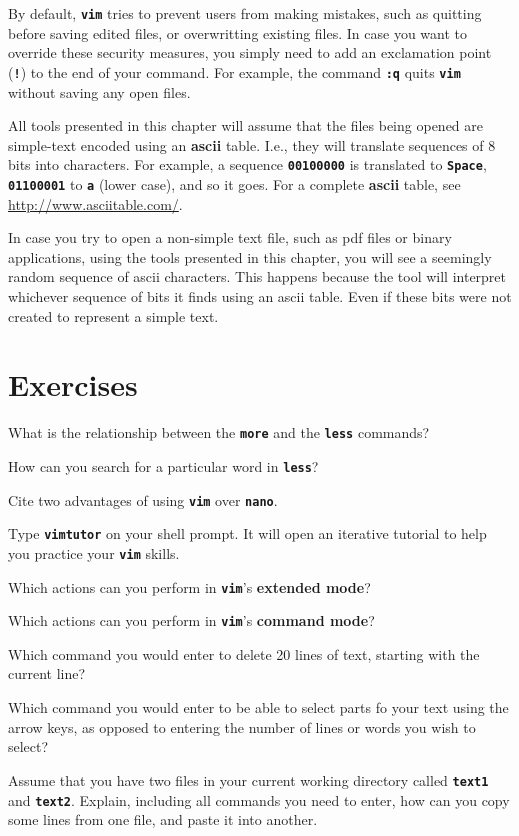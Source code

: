 By default, \textbf{\texttt{vim}} tries to prevent users from making mistakes, such as quitting before saving edited files, or overwritting existing files. In case you want to override these security measures, you simply need to add an exclamation point (\textbf{\texttt{!}}) to the end of your command. For example, the command \textbf{\texttt{:q}} quits \textbf{\texttt{vim}} without saving any open files.

\begin{my_box}
All tools presented in this chapter will assume that the files being opened are simple-text encoded using an \textbf{ascii} table. I.e., they will translate sequences of 8 bits into characters. For example, a sequence \textbf{\texttt{00100000}} is translated to \textbf{\texttt{Space}}, \textbf{\texttt{01100001}} to \textbf{\texttt{a}} (lower case), and so it goes. For a complete \textbf{ascii} table, see \url{http://www.asciitable.com/}.

In case you try to open a non-simple text file, such as pdf files or binary applications, using the tools presented in this chapter, you will see a seemingly random sequence of ascii characters. This happens because the tool will interpret whichever sequence of bits it finds using an ascii table. Even if these bits were not created to represent a simple text.
\end{my_box}


\section*{Exercises}

\begin{exercises}
  \item What is the relationship between the \textbf{\texttt{more}} and the \textbf{\texttt{less}} commands?
  \item How can you search for a particular word in \textbf{\texttt{less}}?
  \item Cite two advantages of using \textbf{\texttt{vim}} over \textbf{\texttt{nano}}.
  \item Type \textbf{\texttt{vimtutor}} on your shell prompt. It will open an iterative tutorial to help you practice your \textbf{\texttt{vim}} skills.
  \item Which actions can you perform in \textbf{\texttt{vim}}'s \textbf{extended mode}?
  \item Which actions can you perform in \textbf{\texttt{vim}}'s \textbf{command mode}?
  \item Which command you would enter to delete 20 lines of text, starting with the current line?
  \item Which command you would enter to be able to select parts fo your text using the arrow keys, as opposed to entering the number of lines or words you wish to select?
  \item Assume that you have two files in your current working directory called \textbf{\texttt{text1}} and \textbf{\texttt{text2}}. Explain, including all commands you need to enter, how can you copy some lines from one file, and paste it into another.

\end{exercises}
